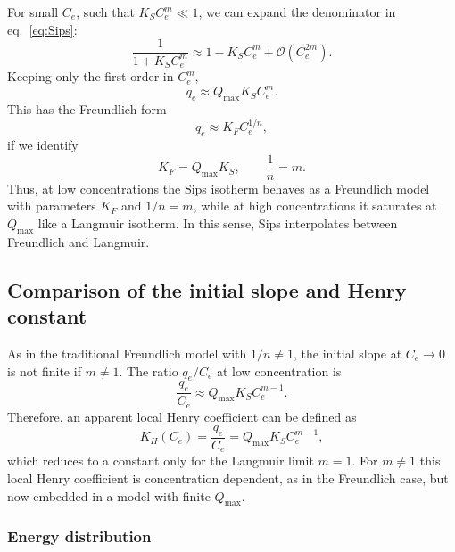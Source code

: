 \documentclass[12pt]{article}
\begin{document}
	For small \(C_e\), such that \(K_S C_e^{m} \ll 1\), we can expand
	the denominator in eq.~\eqref{eq:Sips}:
	\begin{equation}
		\frac{1}{1 + K_S C_e^{m}}
		\approx 1 - K_S C_e^{m} + \mathcal{O}(C_e^{2m}).
	\end{equation}
	Keeping only the first order in \(C_e^{m}\),
	\begin{equation}
		q_e \approx Q_{\max} K_S C_e^{m}.
	\end{equation}
	This has the Freundlich form
	\begin{equation}
		q_e \approx K_F C_e^{1/n},
	\end{equation}
	if we identify
	\begin{equation}
		K_F = Q_{\max} K_S, \qquad \frac{1}{n} = m.
	\end{equation}
	Thus, at low concentrations the Sips isotherm behaves as a
	Freundlich model with parameters \(K_F\) and \(1/n = m\), while at
	high concentrations it saturates at \(Q_{\max}\) like a Langmuir
	isotherm. In this sense, Sips interpolates between Freundlich and
	Langmuir.
	
	\subsection{Comparison of the initial slope and Henry constant}
	
	As in the traditional Freundlich model with \(1/n \neq 1\), the
	initial slope at \(C_e \to 0\) is not finite if \(m \neq 1\). The
	ratio \(q_e / C_e\) at low concentration is
	\begin{equation}
		\frac{q_e}{C_e}
		\approx Q_{\max} K_S C_e^{m-1}.
	\end{equation}
	Therefore, an apparent local Henry coefficient can be defined as
	\begin{equation}
		K_H(C_e)
		= \frac{q_e}{C_e}
		= Q_{\max} K_S C_e^{m - 1},
	\end{equation}
	which reduces to a constant only for the Langmuir limit \(m = 1\).
	For \(m \neq 1\) this local Henry coefficient is concentration
	dependent, as in the Freundlich case, but now embedded in a model
	with finite \(Q_{\max}\).
	
	\subsubsection{Energy distribution}
	
\end{document}
